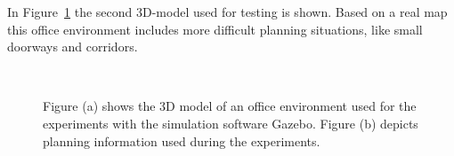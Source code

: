 In Figure~\ref{fig:gazebo_gh25} the second 3D-model used for testing is shown. Based on a real map this office environment includes more difficult planning situations, like small doorways and corridors.

\begin{figure}[thpb]
     \footnotesize
      \centering
      \myfloatalign
      \setlength\fboxsep{0pt}
      \setlength\fboxrule{0.5pt}
       \\
       \caption[Simulation: office environment]{Figure (a) shows the 3D model of an office environment used for the experiments with the simulation software Gazebo. Figure (b) depicts planning information used during the experiments.}
      \label{fig:gazebo_gh25}
   \end{figure}

